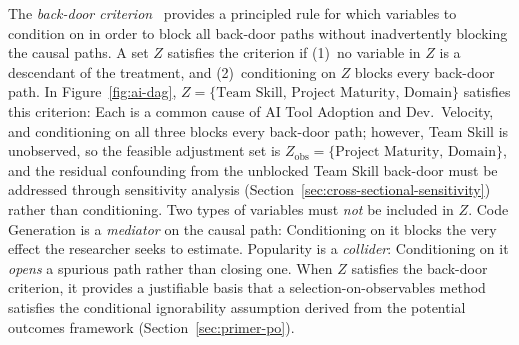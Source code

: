 The \emph{back-door criterion}~\cite{pearl2009causality} provides a principled rule for which variables to condition on in order to block all back-door paths without inadvertently blocking the causal paths.
A set $Z$ satisfies the criterion if (1)~no variable in $Z$ is a descendant of the treatment, and (2)~conditioning on $Z$ blocks every back-door path.
In Figure~\ref{fig:ai-dag}, $Z = \{\text{Team Skill},\, \text{Project Maturity},\, \text{Domain}\}$ satisfies this criterion: Each is a common cause of AI Tool Adoption and Dev.\ Velocity, and conditioning on all three blocks every back-door path; however, Team Skill is unobserved, so the feasible adjustment set is $Z_{\text{obs}} = \{\text{Project Maturity},\, \text{Domain}\}$, and the residual confounding from the unblocked Team Skill back-door must be addressed through sensitivity analysis (Section~\ref{sec:cross-sectional-sensitivity}) rather than conditioning.
Two types of variables must \emph{not} be included in $Z$.
Code Generation is a \emph{mediator} on the causal path: Conditioning on it blocks the very effect the researcher seeks to estimate.
Popularity is a \emph{collider}: Conditioning on it \emph{opens} a spurious path rather than closing one.
When $Z$ satisfies the back-door criterion, it provides a justifiable basis that a selection-on-observables method satisfies the conditional ignorability assumption derived from the potential outcomes framework (Section~\ref{sec:primer-po}).

